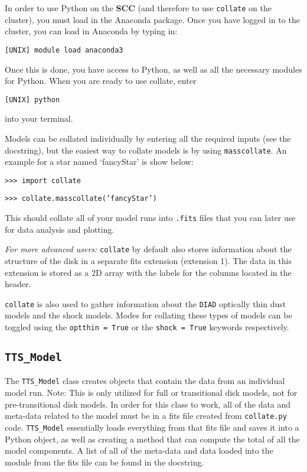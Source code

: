 \documentclass{emulateapj}
\begin{document}
In order to use Python on the \textbf{SCC} (and therefore to use \texttt{collate} on the cluster), you must load in the Anaconda package. Once you have logged in to the cluster, you can load in Anaconda by typing in: 

\vspace{2mm}
\texttt{[UNIX] module load anaconda3}
\vspace{2mm}

\noindent Once this is done, you have access to Python, as well as all the necessary modules for Python. When you are ready to use collate, enter 

\vspace{2mm}
\texttt{[UNIX] python} 
\vspace{2mm}

\noindent into your terminal.

Models can be collated individually by entering all the required inputs (see the docstring), but the easiest way to collate models is by using \texttt{masscollate}. An example for a star named `fancyStar' is show below:

\vspace{2mm}
\texttt{>>> import collate}

\texttt{>>> collate.masscollate('fancyStar')}
\vspace{2mm}

\noindent This should collate all of your model runs into \texttt{.fits} files that you can later use for data analysis and plotting. 

\textit{For more advanced users:} \texttt{collate} by default also stores information about the structure of the disk in a separate fits extension (extension 1). The data in this extension is stored as a 2D array with the labels for the columns located in the header. 

\texttt{collate} is also used to gather information about the \texttt{DIAD} optically thin dust models and the \citep{calvet98} shock models. Modes for collating these types of models can be toggled using the \texttt{optthin = True} or the \texttt{shock = True} keywords respectively.

 
\subsection {\texttt{TTS\_Model}}

The \texttt{TTS\_Model} class creates objects that contain the data from an individual model run. Note: This is only utilized for full or transitional disk models, not for pre-transitional disk models. In order for this class to work, all of the data and meta-data related to the model must be in a fits file created from \texttt{collate.py} code. \texttt{TTS\_Model} essentially loads everything from that fits file and saves it into a Python object, as well as creating a method that can compute the total of all the model components. A list of all of the meta-data and data loaded into the module from the fits file can be found in the docstring. 
 
\end{document}
